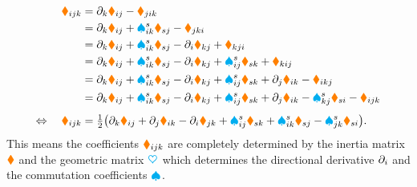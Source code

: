 \begin{align}
 \textcolor{orange}{\blacklozenge}_{ijk} &= \partial_{k} \textcolor{orange}{\blacklozenge}_{ij} - \textcolor{orange}{\blacklozenge}_{jik} 
\nonumber\\
 &= \partial_{k} \textcolor{orange}{\blacklozenge}_{ij} + \textcolor{cyan}{\spadesuit}^{s}_{ik} \textcolor{orange}{\blacklozenge}_{sj} - \textcolor{orange}{\blacklozenge}_{jki} 
\nonumber\\
 &= \partial_{k} \textcolor{orange}{\blacklozenge}_{ij} + \textcolor{cyan}{\spadesuit}^{s}_{ik} \textcolor{orange}{\blacklozenge}_{sj} - \partial_{i} \textcolor{orange}{\blacklozenge}_{kj} + \textcolor{orange}{\blacklozenge}_{kji}
\nonumber\\
 &= \partial_{k} \textcolor{orange}{\blacklozenge}_{ij} + \textcolor{cyan}{\spadesuit}^{s}_{ik} \textcolor{orange}{\blacklozenge}_{sj} - \partial_{i} \textcolor{orange}{\blacklozenge}_{kj} + \textcolor{cyan}{\spadesuit}^{s}_{ij} \textcolor{orange}{\blacklozenge}_{sk} + \textcolor{orange}{\blacklozenge}_{kij}
\nonumber\\
 &= \partial_{k} \textcolor{orange}{\blacklozenge}_{ij} + \textcolor{cyan}{\spadesuit}^{s}_{ik} \textcolor{orange}{\blacklozenge}_{sj} - \partial_{i} \textcolor{orange}{\blacklozenge}_{kj} + \textcolor{cyan}{\spadesuit}^{s}_{ij} \textcolor{orange}{\blacklozenge}_{sk} + \partial_{j} \textcolor{orange}{\blacklozenge}_{ik} - \textcolor{orange}{\blacklozenge}_{ikj}
\nonumber\\
 &= \partial_{k} \textcolor{orange}{\blacklozenge}_{ij} + \textcolor{cyan}{\spadesuit}^{s}_{ik} \textcolor{orange}{\blacklozenge}_{sj} - \partial_{i} \textcolor{orange}{\blacklozenge}_{kj} + \textcolor{cyan}{\spadesuit}^{s}_{ij} \textcolor{orange}{\blacklozenge}_{sk} + \partial_{j} \textcolor{orange}{\blacklozenge}_{ik} - \textcolor{cyan}{\spadesuit}^{s}_{kj} \textcolor{orange}{\blacklozenge}_{si} - \textcolor{orange}{\blacklozenge}_{ijk}
\\[1ex]
 \Leftrightarrow \quad
 \textcolor{orange}{\blacklozenge}_{ijk} &= \tfrac{1}{2}\big( \partial_{k} \textcolor{orange}{\blacklozenge}_{ij} + \partial_{j} \textcolor{orange}{\blacklozenge}_{ik} - \partial_{i} \textcolor{orange}{\blacklozenge}_{jk} + \textcolor{cyan}{\spadesuit}^{s}_{ij} \textcolor{orange}{\blacklozenge}_{sk} + \textcolor{cyan}{\spadesuit}^{s}_{ik} \textcolor{orange}{\blacklozenge}_{sj} - \textcolor{cyan}{\spadesuit}^{s}_{jk} \textcolor{orange}{\blacklozenge}_{si} \big).
\label{eq:DefConnCoeffL}
\end{align}
This means the coefficients $\textcolor{orange}{\blacklozenge}_{ijk}$ are completely determined by the inertia matrix $\boldsymbol{\textcolor{orange}{\blacklozenge}}$ and the geometric matrix $\boldsymbol{\textcolor{cyan}{\heartsuit}}$ which determines the directional derivative $\partial_{i}$ and the commutation coefficients $\boldsymbol{\textcolor{cyan}{\spadesuit}}$.

